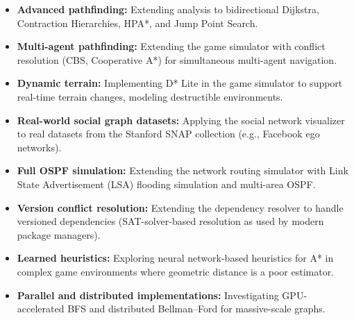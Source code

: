 \documentclass[12pt, a4paper, oneside]{report}
\theoremstyle{definition}
\begin{document}
\begin{itemize}
    \item \textbf{Advanced pathfinding:} Extending analysis to bidirectional Dijkstra, Contraction Hierarchies, HPA*, and Jump Point Search.
    \item \textbf{Multi-agent pathfinding:} Extending the game simulator with conflict resolution (CBS, Cooperative A*) for simultaneous multi-agent navigation.
    \item \textbf{Dynamic terrain:} Implementing D* Lite in the game simulator to support real-time terrain changes, modeling destructible environments.
    \item \textbf{Real-world social graph datasets:} Applying the social network visualizer to real datasets from the Stanford SNAP collection (e.g., Facebook ego networks).
    \item \textbf{Full OSPF simulation:} Extending the network routing simulator with Link State Advertisement (LSA) flooding simulation and multi-area OSPF.
    \item \textbf{Version conflict resolution:} Extending the dependency resolver to handle versioned dependencies (SAT-solver-based resolution as used by modern package managers).
    \item \textbf{Learned heuristics:} Exploring neural network-based heuristics for A* in complex game environments where geometric distance is a poor estimator.
    \item \textbf{Parallel and distributed implementations:} Investigating GPU-accelerated BFS and distributed Bellman–Ford for massive-scale graphs.
\end{itemize}
\end{document}
